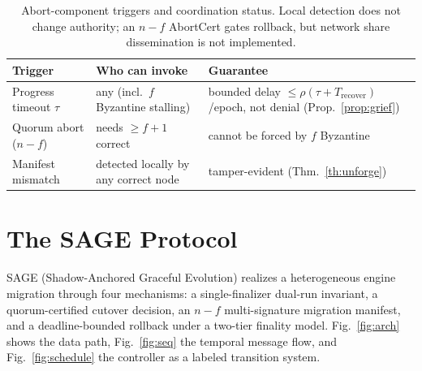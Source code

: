 \documentclass[journal]{IEEEtran}
\theoremstyle{definition}
\theoremstyle{remark}
\begin{document}
\begin{table}[t]
\centering
\caption{Abort-component triggers and coordination status. Local detection does not change
authority; an $n-f$ AbortCert gates rollback, but network share dissemination is not implemented.}
\label{tab:abort}
\setlength{\tabcolsep}{4pt}
\renewcommand{\arraystretch}{1.2}
\footnotesize
\begin{tabular}{L{0.27\columnwidth}L{0.30\columnwidth}L{0.30\columnwidth}}
\toprule
Trigger & Who can invoke & Guarantee \\
\midrule
Progress timeout $\tau$ & any (incl.\ $f$ Byzantine stalling) & bounded delay $\le\rho(\tau{+}T_{\mathrm{recover}})$/epoch, not denial (Prop.~\ref{prop:grief}) \\
Quorum abort ($n{-}f$) & needs $\ge f{+}1$ correct & cannot be forced by $f$ Byzantine \\
Manifest mismatch & detected locally by any correct node & tamper-evident (Thm.~\ref{th:unforge}) \\
\bottomrule
\end{tabular}
\end{table}

\section{The SAGE Protocol}
\label{sec:protocol}

SAGE (Shadow-Anchored Graceful Evolution) realizes a heterogeneous engine migration through
four mechanisms: a single-finalizer dual-run invariant, a quorum-certified cutover decision,
an $n{-}f$ multi-signature migration manifest, and a deadline-bounded rollback under a two-tier
finality model. Fig.~\ref{fig:arch} shows the data path, Fig.~\ref{fig:seq} the temporal
message flow, and Fig.~\ref{fig:schedule} the controller as a labeled transition system.
\end{document}
